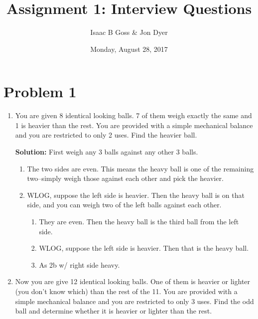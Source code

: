 \documentclass{article}
\author{Isaac B Goss \& Jon Dyer}
\title{Assignment 1: Interview Questions}
\date{Monday, August 28, 2017}
\providecommand{\soln}{\textbf{Solution: }}
\begin{document}
\maketitle

    \section*{Problem 1}
    
    \begin{enumerate}[label=\Alph*.]
        \item You are given 8 identical looking balls. 7 of them weigh exactly the same
        and 1 is heavier than the rest. You are provided with a simple mechanical
        balance and you are restricted to only 2 uses. Find the heavier ball.
        
            \soln First weigh any 3 balls against any other 3 balls.
        
            \begin{enumerate}[label=\textbf{Case \arabic*.}]
                \item The two sides are even.
                This means the heavy ball is one of the remaining two--simply weigh those against each other and pick the heavier.
                
                \item WLOG, suppose the left side is heavier. 
                Then the heavy ball is on that side, and you can weigh two of the left balls against each other.
                
                \begin{enumerate}[label=(\alph*)]
                    \item They are even. Then the heavy ball is the third ball from the left side.
                    \item WLOG, suppose the left side is heavier. Then that is the heavy ball.
                    \item As 2b w/ right side heavy.
                \end{enumerate}
            \end{enumerate}
        
        
        \item Now you are give 12 identical looking balls. One of them is heavier or lighter
        (you don’t know which) than the rest of the 11. You are provided with a
        simple mechanical balance and you are restricted to only 3 uses. Find the
        odd ball and determine whether it is heavier or lighter than the rest.
        

\end{enumerate}
\end{document}
